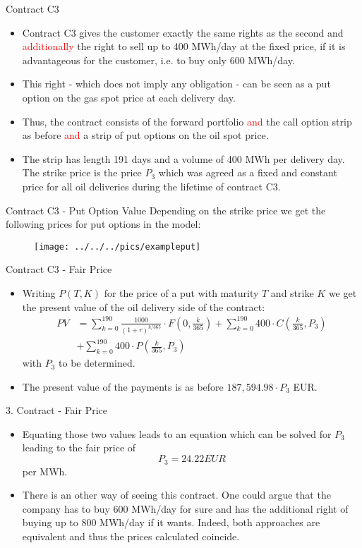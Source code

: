 {Contract C3}
\begin{itemize}
\item<1-> Contract C3 gives the customer exactly the same rights as the second and \textcolor{red}{additionally} the right to sell up to 400 MWh/day at the fixed price, if it is advantageous for the customer, i.e. to buy only 600 MWh/day.
\item<2-> This right - which does not imply any obligation - can be seen as a put option on the gas spot price at each delivery day.
\item<3-> Thus, the contract consists of the forward portfolio \textcolor{red}{and} the call option strip as before \textcolor{red}{and} a strip of put options on the oil spot price.
\item<4-> The strip has length 191 days and a volume of 400 MWh per delivery day. The strike price is the price $P_3$ which was agreed as a fixed and constant price for all oil deliveries during the lifetime of contract C3.
\end{itemize}



{Contract C3  - Put Option Value}
Depending on the strike price we get the following prices for put options in the model:
\begin{figure}
	\centering
		\texttt{[image: ../../../pics/exampleput]}
	\label{fig:exampleput}
\end{figure}



{Contract C3 - Fair Price}
\begin{itemize}
\item<1-> Writing $P(T,K)$ for the price of a put with maturity $T$ and strike $K$ we get the present value of the oil delivery side of the contract:
\begin{align*}
	PV &= \sum_{k=0}^{190} \frac{1000}{(1+r)^{k/365}} \cdot F(0,\frac k {365}) + \sum_{k=0}^{190} 400 \cdot C(\frac k {365},P_3)\\
	 &+ \sum_{k=0}^{190} 400 \cdot P(\frac k {365},P_3)
\end{align*}
with $P_3$ to be determined.
\item<2-> The present value of the payments is as before $187,594.98 \cdot P_3$ EUR.
\end{itemize}



{3. Contract - Fair Price}
\begin{itemize}
\item<1-> Equating those two values leads to an equation which can be solved for $P_3$ leading to the fair price of
$$
	P_3 = 24.22 EUR
$$
per MWh.
\item<2->
There is an other way of seeing this contract. One could argue that the company has to buy 600 MWh/day for sure and has the additional right of buying up to 800 MWh/day if it wants. Indeed, both approaches are equivalent and thus the prices calculated coincide.
\end{itemize}



